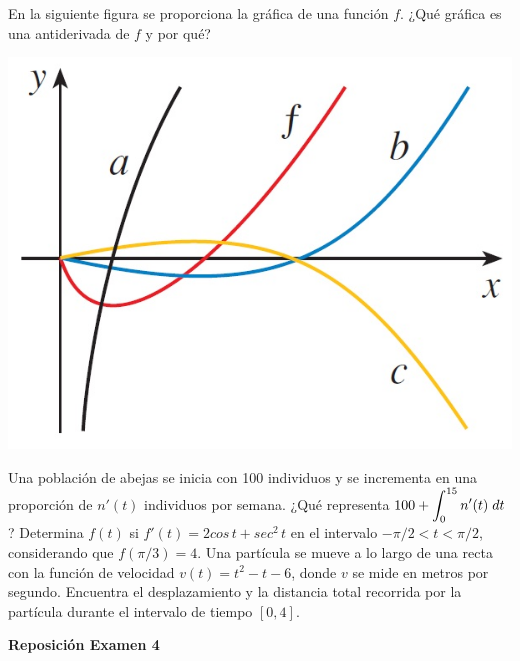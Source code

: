 \documentclass[12pt]{exam}
\begin{document}
\begin{questions}
    \question En la siguiente figura se proporciona la gráfica de una función $f$. ¿Qué gráfica es una antiderivada de $f$ y por qué?
    \begin{center}
      \includegraphics[scale=0.55]{curvas antiderivadas.jpg}   
    \end{center}
   
\vskip10pt

    \question Una población de abejas se inicia con 100 individuos y se incrementa en una proporción de $n'(t)$ individuos por semana. ¿Qué representa $100+\mathlarger{\int_0^{15}n'(t)\;dt}$?
    \vskip10pt
    \question Determina $f(t)$ si $f'(t)=2cos\,t+sec^2\,t$ en el intervalo $-\pi/2 < t < \pi/2$, considerando que $f(\pi/3)=4$.
\vskip12pt
\question Una partícula se mueve a lo largo de una recta con la función de velocidad $v(t)=t^2-t-6$, donde $v$ se mide en metros por segundo. Encuentra el desplazamiento y la distancia total recorrida por la partícula durante el intervalo de tiempo $[0,4]$.
    
    \end{questions}{}

\newpage
\begin{center}
\Large 
\textbf{Reposición Examen 4}
\end{center}{}
\normalsize
\end{document}
